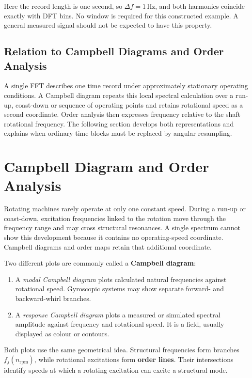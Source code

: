 Here the record length is one second, so $ \Delta f=1\,\mathrm{Hz} $, and both
harmonics coincide exactly with DFT bins. No window is required for this
constructed example. A general measured signal should not be expected to have
this property.

\subsection{Relation to Campbell Diagrams and Order Analysis}

A single FFT describes one time record under approximately stationary operating
conditions. A Campbell diagram repeats this local spectral calculation over a
run-up, coast-down or sequence of operating points and retains rotational speed
as a second coordinate. Order analysis then expresses frequency relative to the
shaft rotational frequency. The following section develops both representations
and explains when ordinary time blocks must be replaced by angular resampling.

\section{Campbell Diagram and Order Analysis}

Rotating machines rarely operate at only one constant speed. During a run-up or
coast-down, excitation frequencies linked to the rotation move through the
frequency range and may cross structural resonances. A single spectrum cannot
show this development because it contains no operating-speed coordinate.
Campbell diagrams and order maps retain that additional coordinate.

Two different plots are commonly called a \textbf{Campbell diagram}:

\begin{enumerate}
    \item A \textit{modal Campbell diagram} plots calculated natural frequencies
        against rotational speed. Gyroscopic systems may show separate forward-
        and backward-whirl branches.

    \item A \textit{response Campbell diagram} plots a measured or simulated
        spectral amplitude against frequency and rotational speed. It is a field,
        usually displayed as colour or contours.
\end{enumerate}

Both plots use the same geometrical idea. Structural frequencies form branches
$ f_j(n_{\mathrm{rpm}}) $, while rotational excitations form \textbf{order lines}.
Their intersections identify speeds at which a rotating excitation can excite a
structural mode.

